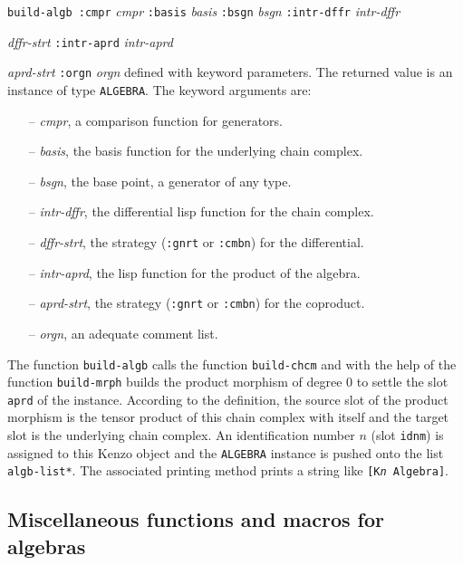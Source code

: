 \vskip 0.40cm
{\tt build-algb :cmpr} {\em cmpr} {\tt :basis} {\em basis} {\tt :bsgn} {\em bsgn} {\tt :intr-dffr} {\em intr-dffr}\par
\hspace*{22.5mm}{\tt :dffr-strt} {\em dffr-strt} {\tt :intr-aprd} {\em intr-aprd} \par
\hspace*{22.5mm}{\tt :aprd-strt} {\em aprd-strt} {\tt :orgn} {\em orgn}
\vskip 0.40cm
defined with keyword parameters. The returned value is an instance of type {\tt ALGEBRA}.
The keyword arguments are:
\begin{itemize}
\item[--] {\em cmpr}, a comparison function for generators.
\item[--] {\em basis}, the basis function for the underlying chain complex.
\item[--] {\em bsgn}, the  base point, a generator of any type.
\item[--] {\em intr-dffr}, the differential lisp function for the chain complex.
\item[--] {\em dffr-strt}, the strategy ({\tt :gnrt} or {\tt :cmbn}) for the differential.
\item[--] {\em intr-aprd}, the lisp function for the product of the algebra.
\item[--] {\em aprd-strt}, the strategy ({\tt :gnrt} or {\tt :cmbn}) for the coproduct.
\item[--] {\em orgn}, an adequate comment list.
\end{itemize}
The function {\tt build-algb} calls  the function {\tt build-chcm} and with the help of the function
{\tt build-mrph} builds the product morphism of degree $0$ to settle the
slot {\tt aprd} of the instance. According to
the definition, the source slot of the product morphism
is the tensor product of this chain complex with itself
and the target slot is the underlying chain complex.
An identification number $n$ (slot {\tt idnm}) is assigned to this Kenzo object
and the {\tt ALGEBRA} instance is  pushed  onto the list {\tt *algb-list*}.
The  associated printing method prints a string like
{\tt [K{\em n} Algebra]}.

\newpage

\subsection {Miscellaneous functions and macros for algebras}

